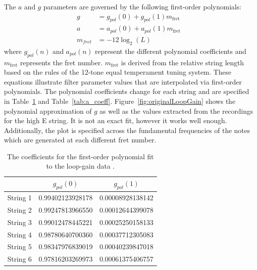 \documentclass[main.tex]{subfiles}
\begin{document}
The $a$ and $g$ parameters are governed by the following first-order polynomials:
\begin{align}
    g &= g_{pol}(0) + g_{pol}(1)m_{\text{fret}}\\
    a &= a_{pol}(0) + a_{pol}(1)m_{\text{fret}}\\
    \label{eq:fretNumber}
    m_{fret} &= -12\log_2(L)
\end{align}
where $g_{pol}(n)$ and $a_{pol}(n)$ represent the different polynomial coefficients and $m_{\text{fret}}$ represents the fret number. $m_{\text{fret}}$ is derived from the relative string length based on the rules of the 12-tone equal temperament tuning system. These equations illustrate filter parameter values that are interpolated via first-order polynomials. The polynomial coefficients change for each string and are specified in Table~\ref{tab:g_coeff} and Table~\ref{tab:a_coeff}. Figure~\ref{fig:originalLoopGain} shows the polynomial approximation of $g$ as well as the values extracted from the recordings for the high E string. It is not an exact fit, however it works well enough. Additionally, the plot is specified across the fundamental frequencies of the notes which are generated at each different fret number.

\begin{table}[h]
\centering
\begin{tabular}{|c| c| c|} 
 \hline
     & $g_{pol}(0)$ & $g_{pol}(1)$ \\ [0.5ex] 
 \hline
 String 1 & 0.99402123928178  & 0.00008928138142 \\ 
 String 2 & 0.99247813966550  & 0.00012644399078 \\ 
 String 3 & 0.99012478445221  & 0.00025250158133 \\ 
 String 4 & 0.98780640700360  & 0.00037712305083 \\ 
 String 5 & 0.98347976839019  & 0.00040239847018 \\ 
 String 6 & 0.97816203269973  & 0.00061375406757 \\ 
 \hline
\end{tabular}
\caption{The coefficients for the first-order polynomial fit to the loop-gain data .}
\label{tab:g_coeff}
\end{table}
\end{document}
